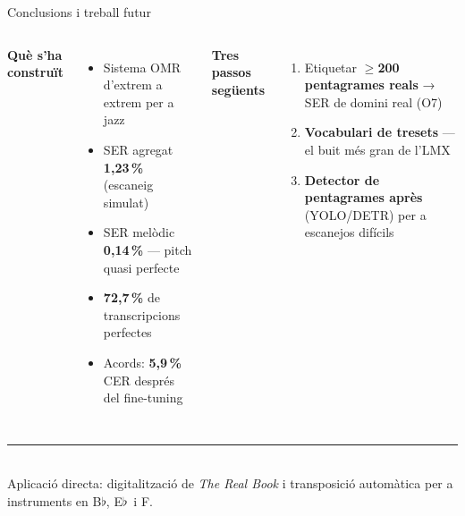 \documentclass[aspectratio=169,10pt]{beamer}
\newcommand{\flatt}{$\flat$}
\begin{document}
\begin{frame}{Conclusions i treball futur}
  \begin{columns}[T]
    \textbf{\color{accent}Què s'ha construït}
    \begin{itemize}
      \setlength\itemsep{0.35em}
      \item Sistema OMR d'extrem a extrem per a jazz
      \item SER agregat \textbf{1,23\,\%} (escaneig simulat)
      \item SER melòdic \textbf{0,14\,\%} — pitch quasi perfecte
      \item \textbf{72,7\,\%} de transcripcions perfectes
      \item Acords: \textbf{5,9\,\%} CER després del fine-tuning
    \end{itemize}

    \textbf{\color{accent}Tres passos següents}
    \begin{enumerate}
      \setlength\itemsep{0.35em}
      \item Etiquetar \textbf{$\geq$200 pentagrames reals} → SER de domini real (O7)
      \item \textbf{Vocabulari de tresets} — el buit més gran de l'LMX
      \item \textbf{Detector de pentagrames après} (YOLO/DETR) per a escanejos difícils
    \end{enumerate}
  \end{columns}
  \vspace{0.6em}
  {\color{accent}\rule{\textwidth}{0.6pt}}
  \vspace{0.3em}\\
  Aplicació directa: digitalització de \textit{The Real Book} i transposició automàtica per a instruments en B\flatt, E\flatt\ i F.
\end{frame}
\end{document}
